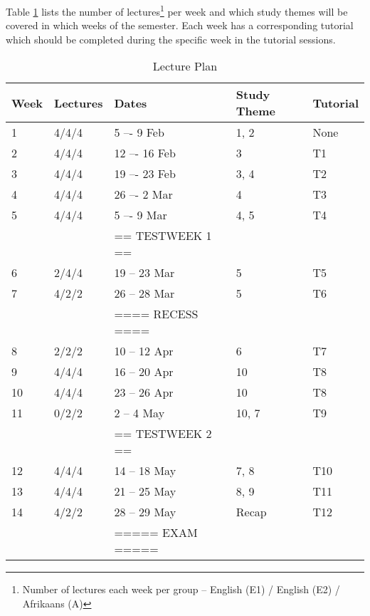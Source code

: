         Table \ref{tab:lec_plan} lists the number of lectures\footnote{Number
        of lectures each week per group -- English (E1) / English (E2) /
        Afrikaans (A)} per week and which study themes will be covered in which
        weeks of the semester. Each week has a corresponding tutorial which
        should be completed during the specific week in the tutorial sessions.

        \begin{table}[!h]
            \begin{center}
             \begin{tabular}{|l|l|l|l|l|}
                 \hline
                 {\bf Week} & {\bf Lectures} & {\bf Dates} & %
                 {\bf Study Theme} & {\bf Tutorial} \\
                 \hline
                 1  & 4/4/4   &  5 –-  9 Feb      & 1, 2  & None \\
                 2  & 4/4/4   & 12 –- 16 Feb      & 3     & T1 \\
                 3  & 4/4/4   & 19 –- 23 Feb      & 3, 4  & T2 \\
                 4  & 4/4/4   & 26 –-  2 Mar      & 4     & T3 \\
                 5  & 4/4/4   &  5 –-  9 Mar      & 4, 5  & T4 \\
                    &       & == TESTWEEK 1 == &       & \\
                 6  & 2/4/4   & 19 -- 23 Mar      & 5     & T5 \\
                 7  & 4/2/2   & 26 -- 28 Mar      & 5     & T6 \\
                    &       & ==== RECESS ==== &       & \\
                 8  & 2/2/2   & 10 -- 12 Apr      & 6     & T7 \\
                 9  & 4/4/4   & 16 -- 20 Apr      & 10    & T8 \\
                 10 & 4/4/4   & 23 -- 26 Apr      & 10    & T8 \\
                 11 & 0/2/2   &  2 --  4 May      & 10, 7 & T9 \\
                    &       & == TESTWEEK 2 == &       & \\
                 12 & 4/4/4   & 14 -- 18 May      & 7, 8  & T10 \\
                 13 & 4/4/4   & 21 -- 25 May      & 8, 9  & T11 \\
                 14 & 4/2/2   & 28 -- 29 May      & Recap & T12 \\
                    &       & ===== EXAM ===== &       & \\
                 \hline
             \end{tabular}
             \caption{Lecture Plan} \label{tab:lec_plan}
            \end{center}
        \end{table}

